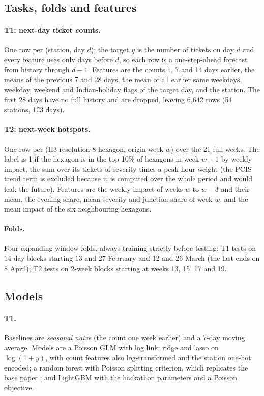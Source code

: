\subsection{Tasks, folds and features}
\paragraph{T1: next-day ticket counts.} One row per (station, day $d$); the target $y$ is the number of tickets on day $d$ and every feature uses only days before $d$, so each row is a one-step-ahead forecast from history through $d-1$. Features are the counts 1, 7 and 14 days earlier, the means of the previous 7 and 28 days, the mean of all earlier same weekdays, weekday, weekend and Indian-holiday flags of the target day, and the station. The first 28 days have no full history and are dropped, leaving 6{,}642 rows (54 stations, 123 days).

\paragraph{T2: next-week hotspots.} One row per (H3 resolution-8 hexagon, origin week $w$) over the 21 full weeks. The label is 1 if the hexagon is in the top 10\% of hexagons in week $w+1$ by weekly impact, the sum over its tickets of severity times a peak-hour weight (the PCIS trend term is excluded because it is computed over the whole period and would leak the future). Features are the weekly impact of weeks $w$ to $w-3$ and their mean, the evening share, mean severity and junction share of week $w$, and the mean impact of the six neighbouring hexagons.

\paragraph{Folds.} Four expanding-window folds, always training strictly before testing: T1 tests on 14-day blocks starting 13 and 27 February and 12 and 26 March (the last ends on 8 April); T2 tests on 2-week blocks starting at weeks 13, 15, 17 and 19.

\subsection{Models}
\paragraph{T1.} Baselines are \emph{seasonal naive} (the count one week earlier) and a 7-day moving average. Models are a Poisson GLM with log link; ridge \citep{hoerl1970ridge} and lasso \citep{tibshirani1996lasso} on $\log(1+y)$, with count features also log-transformed and the station one-hot encoded; a random forest \citep{breiman2001random} with Poisson splitting criterion, which replicates the base paper \citep{gao2019parking}; and LightGBM \citep{ke2017lightgbm} with the hackathon parameters and a Poisson objective.

